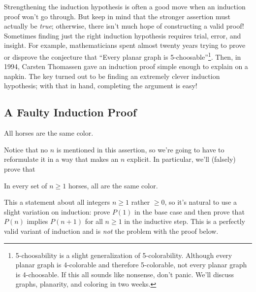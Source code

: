 Strengthening the induction hypothesis is often a good move when an
induction proof won't go through.  But keep in mind that the stronger
assertion must actually be \textit{true}; otherwise, there isn't much
hope of constructing a valid proof!  Sometimes finding just the right
induction hypothesis requires trial, error, and insight.  For example,
mathematicians spent almost twenty years trying to prove or disprove
the conjecture that ``Every planar graph is
5-choosable''\footnote{5-choosability is a slight generalization of
5-colorability.  Although every planar graph is 4-colorable and
therefore 5-colorable, not every planar graph is 4-choosable.  If this
all sounds like nonsense, don't panic.  We'll discuss graphs,
planarity, and coloring in two weeks.}.  Then, in 1994, Carsten
Thomassen gave an induction proof simple enough to explain on a
napkin.  The key turned out to be finding an extremely clever
induction hypothesis; with that in hand, completing the argument is
easy!


\subsection{A Faulty Induction Proof}

\begin{falsethm*}
All horses are the same color.
\end{falsethm*}

Notice that no $n$ is mentioned in this assertion, so we're going to have
to reformulate it in a way that makes an $n$ explicit.  In particular,
we'll (falsely) prove that

\begin{falsethm}\label{horses}
In every set of $n \geq 1$ horses, all are the same color.
\end{falsethm}

This a statement about all integers $n \geq 1$ rather $\geq 0$, so it's
natural to use a slight variation on induction: prove $P(1)$ in the base
case and then prove that $P(n)$ implies $P(n+1)$ for all $n \geq 1$ in the
inductive step.  This is a perfectly valid variant of induction and is
{\em not} the problem with the proof below.

